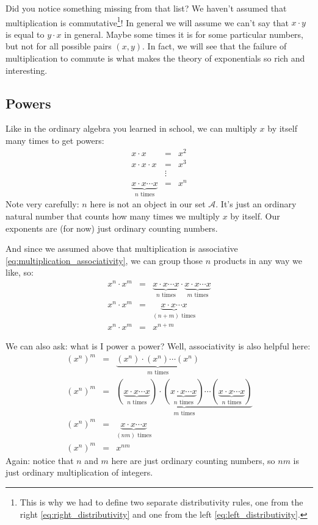 Did you notice something missing from that list? We haven't assumed that multiplication is commutative\footnote{This is why we had to define two separate distributivity rules, one from the right \eqref{eq:right_distributivity} and one from the left \eqref{eq:left_distributivity}.}! In general we will assume we can't say that $x \cdot y$ is equal to $y \cdot x$ in general. Maybe some times it is for some particular numbers, but not for all possible pairs $(x, y)$. In fact, we will see that the failure of multiplication to commute is what makes the theory of exponentials so rich and interesting.

\subsection{Powers}
Like in the ordinary algebra you learned in school, we can multiply $x$ by itself many times to get powers:
\begin{eqnarray*}
    x \cdot x &=& x^2 \\
    x \cdot x \cdot x &=& x^3 \\
     &\vdots& \nonumber \\
    \underbrace{x \cdot x \cdots x}_{n \text{ times}} &=& x^n
\end{eqnarray*}
Note very carefully: $n$ here is not an object in our set $\mathcal{A}$. It's just an ordinary natural number that counts how many times we multiply $x$ by itself. Our exponents are (for now) just ordinary counting numbers.

And since we assumed above that multiplication is associative \eqref{eq:multiplication_associativity}, we can group those $n$ products in any way we like, so:
\begin{eqnarray}
    x^n \cdot x^m &=& \underbrace{x \cdot x \cdots x}_{n \text{ times}} \cdot \underbrace{x \cdot x \cdots x}_{m \text{ times}} \nonumber \\
    x^n \cdot x^m &=& \underbrace{x \cdot x \cdots x}_{(n+m) \text{ times}} \nonumber \\
    \label{eq:exponent_addition}
    x^n \cdot x^m &=& x^{n+m}
\end{eqnarray}

We can also ask: what is I power a power? Well, associativity is also helpful here:
\begin{eqnarray}
    (x^n)^m &=& \underbrace{(x^n) \cdot (x^n) \cdots (x^n)}_{m \text{ times}} \nonumber \\
    (x^n)^m &=& \underbrace{(\underbrace{x \cdot x \cdots x}_{n \text{ times}}) \cdot (\underbrace{x \cdot x \cdots x}_{n \text{ times}}) \cdots (\underbrace{x \cdot x \cdots x}_{n \text{ times}})}_{m \text{ times}} \nonumber \\
    (x^n)^m &=& \underbrace{x \cdot x \cdots x}_{(nm) \text{ times}} \nonumber \\
    \label{eq:exponent_power}
    (x^n)^m &=& x^{nm}
\end{eqnarray}
Again: notice that $n$ and $m$ here are just ordinary counting numbers, so $nm$ is just ordinary multiplication of integers.
